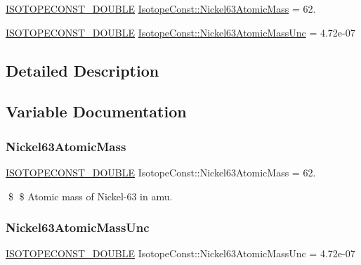 \begin{DoxyCompactItemize}
\item 
\mbox{\hyperlink{group___isotope_const-_macros_ga8f45a7272ce02c0b4c65c44636ed719a}{I\+S\+O\+T\+O\+P\+E\+C\+O\+N\+S\+T\+\_\+\+D\+O\+U\+B\+LE}} \mbox{\hyperlink{group___isotope_const-_nickel-_ni63_ga0d4e1ea4b105b81e966a7113805c094f}{Isotope\+Const\+::\+Nickel63\+Atomic\+Mass}} = 62.
\item 
\mbox{\hyperlink{group___isotope_const-_macros_ga8f45a7272ce02c0b4c65c44636ed719a}{I\+S\+O\+T\+O\+P\+E\+C\+O\+N\+S\+T\+\_\+\+D\+O\+U\+B\+LE}} \mbox{\hyperlink{group___isotope_const-_nickel-_ni63_ga76e227c5bb22f677a2c0319d5ff115d1}{Isotope\+Const\+::\+Nickel63\+Atomic\+Mass\+Unc}} = 4.\+72e-\/07
\end{DoxyCompactItemize}


\subsection{Detailed Description}


\subsection{Variable Documentation}
\mbox{\label{group___isotope_const-_nickel-_ni63_ga0d4e1ea4b105b81e966a7113805c094f}} 
\subsubsection{\texorpdfstring{Nickel63\+Atomic\+Mass}{Nickel63AtomicMass}}
{\footnotesize\ttfamily \mbox{\hyperlink{group___isotope_const-_macros_ga8f45a7272ce02c0b4c65c44636ed719a}{I\+S\+O\+T\+O\+P\+E\+C\+O\+N\+S\+T\+\_\+\+D\+O\+U\+B\+LE}} Isotope\+Const\+::\+Nickel63\+Atomic\+Mass = 62.}

\$ \$ Atomic mass of Nickel-\/63 in amu. \mbox{\label{group___isotope_const-_nickel-_ni63_ga76e227c5bb22f677a2c0319d5ff115d1}} 
\subsubsection{\texorpdfstring{Nickel63\+Atomic\+Mass\+Unc}{Nickel63AtomicMassUnc}}
{\footnotesize\ttfamily \mbox{\hyperlink{group___isotope_const-_macros_ga8f45a7272ce02c0b4c65c44636ed719a}{I\+S\+O\+T\+O\+P\+E\+C\+O\+N\+S\+T\+\_\+\+D\+O\+U\+B\+LE}} Isotope\+Const\+::\+Nickel63\+Atomic\+Mass\+Unc = 4.\+72e-\/07}

